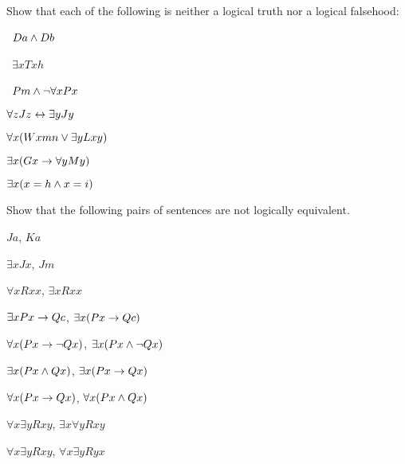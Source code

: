 
\practiceproblems


\problempart
\label{pr.Contingent}
Show that each of the following is neither a logical truth nor a logical falsehood:
\begin{earg}
\item \leftsolutions\ $Da \wedge Db$
\item \leftsolutions\ $\exists x Txh$
\item \leftsolutions\ $Pm \wedge \neg\forall x Px$
\item $\forall z Jz \leftrightarrow \exists y Jy$
\item $\forall x (Wxmn \vee \exists yLxy)$
\item $\exists x (Gx \rightarrow \forall y My)$
\item $\exists x (x = h \wedge x = i)$
\end{earg}

\solutions
\problempart
\label{pr.NotEquiv}
Show that the following pairs of sentences are not logically equivalent.
\begin{earg}
\item $Ja$, $Ka$
\item $\exists x Jx$, $Jm$
\item $\forall x Rxx$, $\exists x Rxx$
\item $\exists x Px \rightarrow Qc$, $\exists x (Px \rightarrow Qc)$
\item $\forall x(Px \rightarrow \neg Qx)$, $\exists x(Px \wedge \neg Qx)$
\item $\exists x(Px \wedge Qx)$, $\exists x(Px \rightarrow Qx)$
\item $\forall x(Px\rightarrow Qx)$, $\forall x(Px \wedge Qx)$
\item $\forall x\exists y Rxy$, $\exists x\forall y Rxy$
\item $\forall x\exists y Rxy$, $\forall x\exists y Ryx$
\end{earg}



